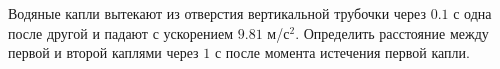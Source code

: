 Водяные капли вытекают из отверстия вертикальной трубочки через $0.1$ с
одна после другой и падают с ускорением $9.81$ м/с$^2$. Определить
расстояние между первой и второй каплями через $1$ с после момента
истечения первой капли.
